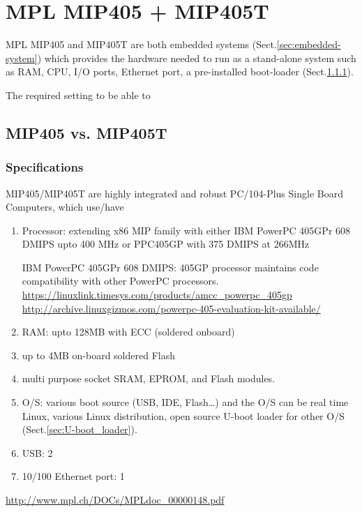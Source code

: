 \chapter{MPL MIP405 + MIP405T}
\label{chap:embedded_MPL_MIP405-MIP405T}

MPL MIP405 and MIP405T are both embedded systems
(Sect.\ref{sec:embedded-system}) which provides the hardware needed to run as a
stand-alone system such as RAM, CPU, I/O ports, Ethernet port, a pre-installed
boot-loader (Sect.\ref{sec:MIP405_MIP405T_specs}).


The required setting to be able to 

\section{MIP405 vs. MIP405T}
\label{sec:MIP405_MIP405T}

\subsection{Specifications}
\label{sec:MIP405_MIP405T_specs}

MIP405/MIP405T are highly integrated and robust
PC/104-Plus Single Board Computers, which use/have
\begin{enumerate}
  \item Processor: extending x86 MIP family with either
  IBM PowerPC 405GPr 608 DMIPS upto 400 MHz or 
  PPC405GP with 375 DMIPS at 266MHz 
  
  IBM PowerPC 405GPr 608 DMIPS: 405GP processor maintains code compatibility
  with other PowerPC processors.
  \url{https://linuxlink.timesys.com/products/amcc_powerpc_405gp}
  \url{http://archive.linuxgizmos.com/powerpc-405-evaluation-kit-available/}
  
  \item RAM: upto 128MB with ECC (soldered onboard)
  
  \item up to 4MB on-board soldered Flash
  
  \item multi purpose socket SRAM, EPROM, and Flash modules.
  
  \item O/S: various boot source (USB, IDE, Flash\ldots) and the O/S can be real
  time Linux, various Linux distribution, open source U-boot loader for other
  O/S (Sect.\ref{sec:U-boot_loader}).
  
  \item USB: 2
  
  \item 10/100 Ethernet port: 1
   
\end{enumerate}
\url{http://www.mpl.ch/DOCs/MPLdoc_00000148.pdf}

